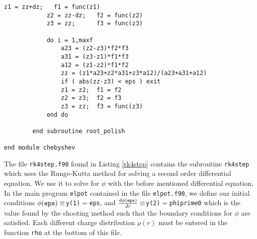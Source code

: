 \documentclass[12pt]{article}
\begin{document}
\begin{lstlisting}[frame=single,caption={{\tt cheby.f90}},label=cheby]
            z1 = zz+dz;   f1 = func(z1)
            z2 = zz-dz;   f2 = func(z2)
            z3 = zz;      f3 = func(z3)

            do i = 1,maxf
                a23 = (z2-z3)*f2*f3
                a31 = (z3-z1)*f1*f3
                a12 = (z1-z2)*f1*f2
                zz = (z1*a23+z2*a31+z3*a12)/(a23+a31+a12)
                if ( abs(zz-z3) < eps ) exit
                z1 = z2;  f1 = f2
                z2 = z3;  f2 = f3
                z3 = zz;  f3 = func(z3)
            end do
        
        end subroutine root_polish
      
end module chebyshev

\end{lstlisting}

The file {\tt rk4step.f90} found in Listing \ref{rk4step} contains the subroutine {\tt rk4step} which uses the Runge-Kutta method for solving a second order differential equation.  We use it to solve for $\phi$ with the before mentioned differential equation.  In the main program {\tt elpot} contained in the file {\tt elpot.f90}, we define our initial conditions $\phi({\tt eps})\equiv${\tt y(1)}$=${\tt eps}, and $\frac{d\phi({\tt eps})}{dr}\equiv${\tt y(2)}$=${\tt phiprime0} which is the value found by the shooting method such that the boundary conditions for $\phi$ are satisfied.  Each different charge distribution $\rho(r)$  must be entered in the function {\tt rho} at the bottom of this file.
\end{document}
